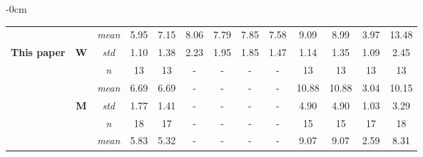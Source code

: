 \documentclass[journal,article,submit,pdftex,moreauthors]{Definitions/mdpi}
\begin{document}
\begin{table}[H]
\begin{adjustwidth}{-\extralength}{0cm}
{\begin{tabular}{ccccccccccccc}
 &  & {\color[HTML]{FE0000} \textit{mean}} & {\color[HTML]{FE0000} 5.95} & {\color[HTML]{FE0000} 7.15} & {\color[HTML]{FE0000} 8.06} & {\color[HTML]{FE0000} 7.79} & {\color[HTML]{FE0000} 7.85} & {\color[HTML]{FE0000} 7.58} & {\color[HTML]{FE0000} 9.09} & {\color[HTML]{FE0000} 8.99} & {\color[HTML]{FE0000} 3.97} & {\color[HTML]{FE0000} 13.48} \\ \cline{3-13} 
\multirow{-6}{*}{\textbf{This paper}} & \multirow{-3}{*}{{\color[HTML]{FE0000} \textbf{W}}} & {\color[HTML]{FE0000} \textit{std}} & {\color[HTML]{FE0000} 1.10} & {\color[HTML]{FE0000} 1.38} & {\color[HTML]{FE0000} 2.23} & {\color[HTML]{FE0000} 1.95} & {\color[HTML]{FE0000} 1.85} & {\color[HTML]{FE0000} 1.47} & {\color[HTML]{FE0000} 1.14} & {\color[HTML]{FE0000} 1.35} & {\color[HTML]{FE0000} 1.09} & {\color[HTML]{FE0000} 2.45} \\ \hline
 &  & {\color[HTML]{3531FF} \textit{n}} & {\color[HTML]{3531FF} 13} & {\color[HTML]{3531FF} 13} & {\color[HTML]{3531FF} -} & {\color[HTML]{3531FF} -} & {\color[HTML]{3531FF} -} & {\color[HTML]{3531FF} -} & {\color[HTML]{3531FF} 13} & {\color[HTML]{3531FF} 13} & {\color[HTML]{3531FF} 13} & {\color[HTML]{3531FF} 13} \\ \cline{3-13} 
 &  & {\color[HTML]{3531FF} \textit{mean}} & {\color[HTML]{3531FF} 6.69} & {\color[HTML]{3531FF} 6.69} & {\color[HTML]{3531FF} -} & {\color[HTML]{3531FF} -} & {\color[HTML]{3531FF} -} & {\color[HTML]{3531FF} -} & {\color[HTML]{3531FF} 10.88} & {\color[HTML]{3531FF} 10.88} & {\color[HTML]{3531FF} 3.04} & {\color[HTML]{3531FF} 10.15} \\ \cline{3-13} 
 & \multirow{-3}{*}{{\color[HTML]{3531FF} \textbf{M}}} & {\color[HTML]{3531FF} \textit{std}} & {\color[HTML]{3531FF} 1.77} & {\color[HTML]{3531FF} 1.41} & {\color[HTML]{3531FF} -} & {\color[HTML]{3531FF} -} & {\color[HTML]{3531FF} -} & {\color[HTML]{3531FF} -} & {\color[HTML]{3531FF} 4.90} & {\color[HTML]{3531FF} 4.90} & {\color[HTML]{3531FF} 1.03} & {\color[HTML]{3531FF} 3.29} \\ \cline{2-13} 
 &  & {\color[HTML]{FE0000} \textit{n}} & {\color[HTML]{FE0000} 18} & {\color[HTML]{FE0000} 17} & {\color[HTML]{FE0000} -} & {\color[HTML]{FE0000} -} & {\color[HTML]{FE0000} -} & {\color[HTML]{FE0000} -} & {\color[HTML]{FE0000} 15} & {\color[HTML]{FE0000} 15} & {\color[HTML]{FE0000} 17} & {\color[HTML]{FE0000} 18} \\ \cline{3-13} 
 &  & {\color[HTML]{FE0000} \textit{mean}} & {\color[HTML]{FE0000} 5.83} & {\color[HTML]{FE0000} 5.32} & {\color[HTML]{FE0000} -} & {\color[HTML]{FE0000} -} & {\color[HTML]{FE0000} -} & {\color[HTML]{FE0000} -} & {\color[HTML]{FE0000} 9.07} & {\color[HTML]{FE0000} 9.07} & {\color[HTML]{FE0000} 2.59} & {\color[HTML]{FE0000} 8.31} \\ \cline{3-13} 

\end{tabular}}
\end{adjustwidth}
\end{table}
\end{document}
